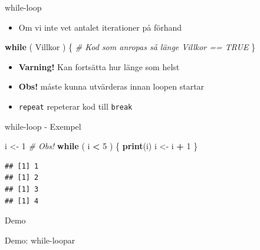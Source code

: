 \documentclass[
  11pt,
  ignorenonframetext,
]{beamer}
\newenvironment{Shaded}{\begin{snugshade}}{\end{snugshade}}
\newcommand{\CommentTok}[1]{\textcolor[rgb]{0.56,0.35,0.01}{\textit{#1}}}
\newcommand{\ControlFlowTok}[1]{\textcolor[rgb]{0.13,0.29,0.53}{\textbf{#1}}}
\newcommand{\DecValTok}[1]{\textcolor[rgb]{0.00,0.00,0.81}{#1}}
\newcommand{\FunctionTok}[1]{\textcolor[rgb]{0.13,0.29,0.53}{\textbf{#1}}}
\newcommand{\NormalTok}[1]{#1}
\newcommand{\OtherTok}[1]{\textcolor[rgb]{0.56,0.35,0.01}{#1}}
\newcommand{\SpecialCharTok}[1]{\textcolor[rgb]{0.81,0.36,0.00}{\textbf{#1}}}
\providecommand{\tightlist}{%
  \setlength{\itemsep}{0pt}\setlength{\parskip}{0pt}}
\newcommand\imp[1]{\alert{\textbf{#1}}}
\begin{document}
\begin{frame}[fragile]{while-loop}
\label{while-loop-1}
\begin{itemize}
\tightlist
\item
  Om vi inte vet antalet iterationer på förhand
\end{itemize}

\begin{Shaded}
\begin{Highlighting}[]
\ControlFlowTok{while}\NormalTok{ ( Villkor ) \{}
  \CommentTok{\# Kod som anropas så länge Villkor == TRUE}
\NormalTok{\}}
\end{Highlighting}
\end{Shaded}

\begin{itemize}
\tightlist
\item
  \imp{Varning!} Kan fortsätta hur länge som helst
\item
  \imp{Obs!}  måste kunna utvärderas innan loopen startar
\item
  \texttt{repeat} repeterar kod till \texttt{break}
\end{itemize}
\end{frame}

\begin{frame}[fragile]{while-loop - Exempel}
\label{while-loop---exempel}
\begin{Shaded}
\begin{Highlighting}[]
\NormalTok{i }\OtherTok{\textless{}{-}} \DecValTok{1} \CommentTok{\# Obs!}
\ControlFlowTok{while}\NormalTok{ ( i }\SpecialCharTok{\textless{}} \DecValTok{5}\NormalTok{ ) \{}
  \FunctionTok{print}\NormalTok{(i)}
\NormalTok{  i }\OtherTok{\textless{}{-}}\NormalTok{ i }\SpecialCharTok{+} \DecValTok{1}
\NormalTok{\}}
\end{Highlighting}
\end{Shaded}

\pause

\begin{verbatim}
## [1] 1
## [1] 2
## [1] 3
## [1] 4
\end{verbatim}
\end{frame}

\begin{frame}{Demo}
\label{demo-3}
\begin{block}{Demo: while-loopar}
\label{demo-while-loopar}
\end{block}
\end{frame}
\end{document}
